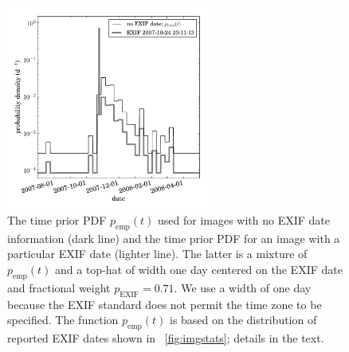 \documentclass[12pt,preprint]{aastex}
\newcommand{\figref}[1]{\figurename~\ref{#1}}
\newcommand{\pempirical}{p_\mathrm{emp}}
\newcommand{\exif}{\mathrm{EXIF}}
\newcommand{\pexif}{p_\exif}
\begin{document}
\clearpage
\begin{figure}
\begin{center}
\includegraphics[width=0.6\textwidth]{exif8}
\end{center}
\caption[exif times]{The time prior PDF $\pempirical(t)$ used for
  images with no EXIF date information (dark line) and the time prior
  PDF for an image with a particular EXIF date (lighter line).  The
  latter is a mixture of $\pempirical(t)$ and a top-hat of width one
  day centered on the EXIF date and fractional weight $\pexif = 0.71$.
  We use a width of one day because the EXIF standard does not permit
  the time zone to be specified.  The function $\pempirical(t)$ is
  based on the distribution of reported EXIF dates shown in
  \figref{fig:imgstats}; details in the
  text.\label{fig:empirical}}
\end{figure}
\end{document}
